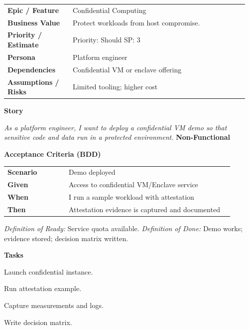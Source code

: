 \documentclass[11pt,letterpaper]{article}
\makeatletter
\newenvironment{kvtable}{%
  \begin{tabular}{@{}>{\bfseries\arraybackslash}p{0.26\linewidth} p{0.70\linewidth}@{}}
}{\end{tabular}}
\newenvironment{bdd}{%
  \begin{tabular}{@{}>{\bfseries\arraybackslash}p{0.26\linewidth} p{0.70\linewidth}@{}}
}{\end{tabular}}
\newcommand{\DoRDoD}[2]{%
  \vspace{0.35em}
  {\footnotesize\color{Muted}%
    \textit{Definition of Ready:} #1 \; \textbullet\;
    \textit{Definition of Done:} #2%
  }%
}
\newenvironment{storycard}[2]{%
  \begin{tcolorbox}[cloudcard, title={#1 --- #2}]%
}{\end{tcolorbox}}
\newcommand{\sectionlabel}[1]{\vspace{0.35em}\textbf{#1}\par}
\makeatother
\begin{document}
\begin{storycard}{CCS-22}{Ch. 22 — Secure Computation Outsourcing}
\begin{kvtable}
Epic / Feature & Confidential Computing\\
Business Value & Protect workloads from host compromise.\\
Priority / Estimate & Priority: Should \quad SP: 3\\
Persona & Platform engineer\\
Dependencies & Confidential VM or enclave offering\\
Assumptions / Risks & Limited tooling; higher cost\\
\end{kvtable}
\sectionlabel{Story}
\textit{As a platform engineer, I want to deploy a confidential VM demo so that sensitive code and data run in a protected environment.}
\sectionlabel{Non-Functional}\;
\sectionlabel{Acceptance Criteria (BDD)}
\begin{bdd}
Scenario & Demo deployed\\
Given & Access to confidential VM/Enclave service\\
When & I run a sample workload with attestation\\
Then & Attestation evidence is captured and documented\\
\end{bdd}
\DoRDoD{Service quota available.}{Demo works; evidence stored; decision matrix written.}
\sectionlabel{Tasks}
\begin{checklist}
\item Launch confidential instance.
\item Run attestation example.
\item Capture measurements and logs.
\item Write decision matrix.
\end{checklist}
\end{storycard}
\end{document}
